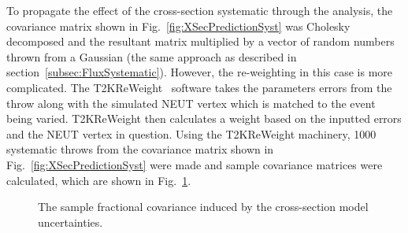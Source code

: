 \newline
\newline
To propagate the effect of the cross-section systematic through the analysis, the covariance matrix shown in Fig.~\ref{fig:XSecPredictionSyst} was Cholesky decomposed and the resultant matrix multiplied by a vector of random numbers thrown from a Gaussian (the same approach as described in section~\ref{subsec:FluxSystematic}).  However, the re-weighting in this case is more complicated.  The T2KReWeight~\cite{T2KReWeightTN} software takes the parameters errors from the throw along with the simulated NEUT vertex which is matched to the event being varied.  T2KReWeight then calculates a weight based on the inputted errors and the NEUT vertex in question.  Using the T2KReWeight machinery, 1000 systematic throws from the covariance matrix shown in Fig.~\ref{fig:XSecPredictionSyst} were made and sample covariance matrices were calculated, which are shown in Fig.~\ref{fig:XSecCovarianceMatrices}.
\begin{figure}[t!]
  \centering
  \caption{The sample fractional covariance induced by the cross-section model uncertainties.}
  \label{fig:XSecCovarianceMatrices}
\end{figure}
